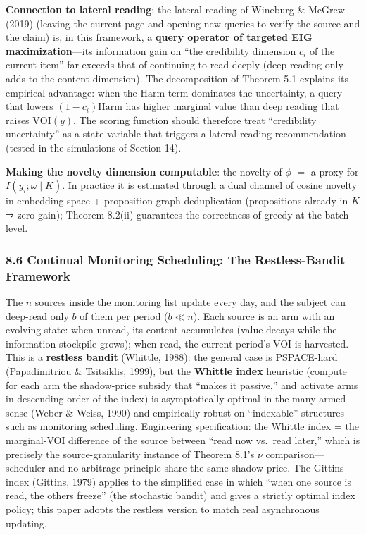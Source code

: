 \documentclass[
  11pt]{article}
\begin{document}
\textbf{Connection to lateral reading}: the lateral reading of Wineburg
\& McGrew (2019) (leaving the current page and opening new queries to
verify the source and the claim) is, in this framework, a \textbf{query
operator of targeted EIG maximization}---its information gain on ``the
credibility dimension \(c_i\) of the current item'' far exceeds that of
continuing to read deeply (deep reading only adds to the content
dimension). The decomposition of Theorem 5.1 explains its empirical
advantage: when the \(\mathrm{Harm}\) term dominates the uncertainty, a
query that lowers \((1-c_i)\mathrm{Harm}\) has higher marginal value
than deep reading that raises \(\mathrm{VOI}(y)\). The scoring function
should therefore treat ``credibility uncertainty'' as a state variable
that triggers a lateral-reading recommendation (tested in the
simulations of Section 14).

\textbf{Making the novelty dimension computable}: the novelty of
\(\phi\) \(=\) a proxy for \(I(y_i; \omega \mid K)\). In practice it is
estimated through a dual channel of cosine novelty in embedding space +
proposition-graph deduplication (propositions already in \(K\) ⇒ zero
gain); Theorem 8.2(ii) guarantees the correctness of greedy at the batch
level.

\subsubsection{8.6 Continual Monitoring Scheduling: The Restless-Bandit
Framework}\label{continual-monitoring-scheduling-the-restless-bandit-framework}

The \(n\) sources inside the monitoring list update every day, and the
subject can deep-read only \(b\) of them per period (\(b \ll n\)). Each
source is an arm with an evolving state: when unread, its content
accumulates (value decays while the information stockpile grows); when
read, the current period's VOI is harvested. This is a \textbf{restless
bandit} (Whittle, 1988): the general case is PSPACE-hard (Papadimitriou
\& Tsitsiklis, 1999), but the \textbf{Whittle index} heuristic (compute
for each arm the shadow-price subsidy that ``makes it passive,'' and
activate arms in descending order of the index) is asymptotically
optimal in the many-armed sense (Weber \& Weiss, 1990) and empirically
robust on ``indexable'' structures such as monitoring scheduling.
Engineering specification: the Whittle index = the marginal-VOI
difference of the source between ``read now vs.~read later,'' which is
precisely the source-granularity instance of Theorem 8.1's \(\nu\)
comparison---scheduler and no-arbitrage principle share the same shadow
price. The Gittins index (Gittins, 1979) applies to the simplified case
in which ``when one source is read, the others freeze'' (the stochastic
bandit) and gives a strictly optimal index policy; this paper adopts the
restless version to match real asynchronous updating.
\end{document}
